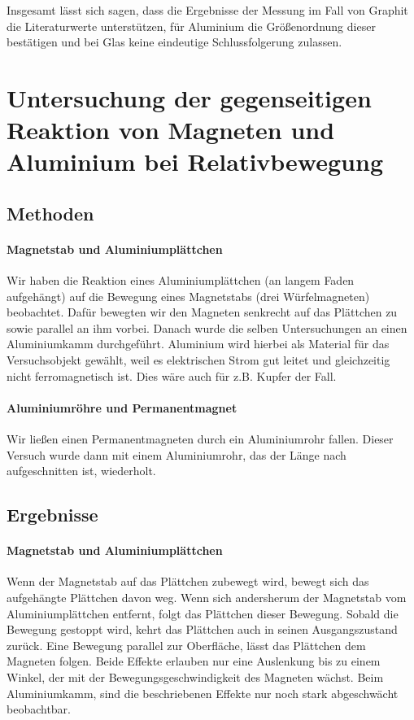\documentclass[
	a4paper,
	12pt,
	pagesize,
	ngerman
]{scrartcl}
\begin{document}
	Insgesamt lässt sich sagen, dass die Ergebnisse der Messung im Fall von Graphit die Literaturwerte unterstützen, für Aluminium die Größenordnung dieser bestätigen und bei Glas keine eindeutige Schlussfolgerung zulassen.
	
	\section{Untersuchung der gegenseitigen Reaktion von Magneten und Aluminium bei Relativbewegung}
	\subsection{Methoden}
	\paragraph{Magnetstab und Aluminiumplättchen}
	Wir haben die Reaktion eines Aluminiumplättchen (an langem Faden aufgehängt) auf die Bewegung eines Magnetstabs (drei Würfelmagneten) beobachtet. Dafür bewegten wir den Magneten senkrecht auf das Plättchen zu sowie parallel an ihm vorbei.
	Danach wurde die selben Untersuchungen an einen Aluminiumkamm durchgeführt. Aluminium wird hierbei als Material für das Versuchsobjekt gewählt, weil es elektrischen Strom gut leitet und gleichzeitig nicht ferromagnetisch ist. Dies wäre auch für z.B. Kupfer der Fall. 
	\paragraph{Aluminiumröhre und Permanentmagnet}
	Wir ließen einen Permanentmagneten durch ein Aluminiumrohr fallen. Dieser Versuch wurde dann mit einem Aluminiumrohr, das der Länge nach aufgeschnitten ist, wiederholt.
	\subsection{Ergebnisse}
	\paragraph{Magnetstab und Aluminiumplättchen}
	Wenn der Magnetstab auf das Plättchen zubewegt wird, bewegt sich das aufgehängte Plättchen davon weg. Wenn sich andersherum der Magnetstab vom Aluminiumplättchen entfernt, folgt das Plättchen dieser Bewegung. Sobald die Bewegung gestoppt wird, kehrt das Plättchen auch in seinen Ausgangszustand zurück. Eine Bewegung parallel zur Oberfläche, lässt das Plättchen dem Magneten folgen. Beide Effekte erlauben nur eine Auslenkung bis zu einem Winkel, der mit der Bewegungsgeschwindigkeit des Magneten wächst. %
	Beim Aluminiumkamm, sind die beschriebenen Effekte nur noch stark abgeschwächt beobachtbar.
\end{document}
